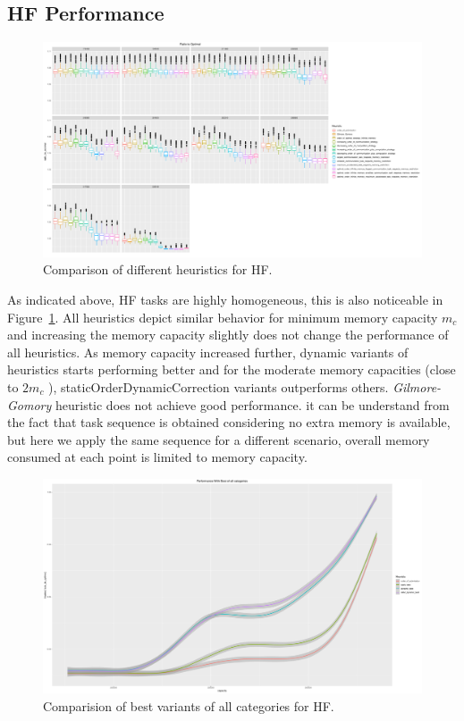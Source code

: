 \documentclass[runningheads]{llncs} %
\begin{document}
\subsection{HF Performance}	
	\begin{figure}[htb]
		\includegraphics[scale=0.3]{../ExperimentalResults/ratio_to_optimal_hf.pdf}
		\caption{Comparison of different heuristics for HF.}
		\label{fig:ratio_to_optimal_hf}
	\end{figure}
 As indicated above, HF tasks are highly homogeneous, this is also noticeable in Figure~\ref{fig:ratio_to_optimal_hf}. All heuristics depict similar behavior for minimum memory capacity $m_c$  and  increasing the memory capacity slightly does not change the performance of all heuristics. As memory capacity increased further, dynamic variants of heuristics starts performing better and for the moderate memory capacities (close to $2m_c$ ), staticOrderDynamicCorrection variants outperforms others. \textit{Gilmore-Gomory} heuristic does not achieve good performance. it can be understand from the fact that task sequence is obtained considering no extra memory is available, but here we apply the same sequence for a different scenario,  overall memory consumed at each point is limited to memory capacity.


	\begin{figure}[htb]
	\includegraphics[scale=0.25]{../ExperimentalResults/inverse_ratio_to_optimal_hf-best.pdf}
	\caption{Comparision of best variants of all categories for HF.}
	\label{fig:ratio_to_optimal_best_hf}
	\end{figure}
\end{document}
